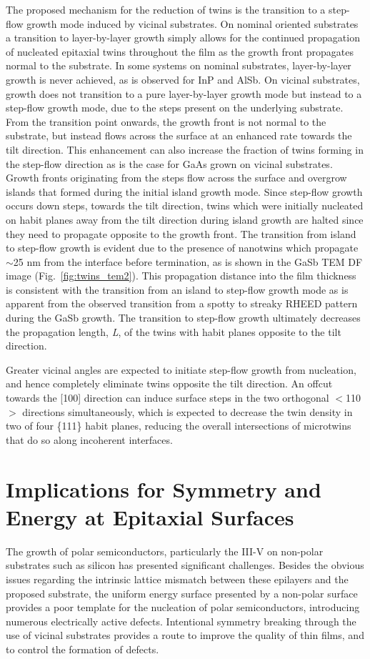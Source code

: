 The proposed mechanism for the reduction of twins is the transition to a step-flow growth mode induced by vicinal substrates. On nominal oriented substrates a transition to layer-by-layer growth simply allows for the continued propagation of nucleated epitaxial twins throughout the film as the growth front propagates normal to the substrate. In some systems on nominal substrates, layer-by-layer growth is never achieved, as is observed for InP and AlSb. On vicinal substrates, growth does not transition to a pure layer-by-layer growth mode but instead to a step-flow growth mode, due to the steps present on the underlying substrate. From the transition point onwards, the growth front is not normal to the substrate, but instead flows across the surface at an enhanced rate towards the tilt direction. This enhancement can also increase the fraction of twins forming in the step-flow direction as is the case for GaAs grown on vicinal substrates. Growth fronts originating from the steps flow across the surface and overgrow islands that formed during the initial island growth mode. Since step-flow growth occurs down steps, towards the tilt direction, twins which were initially nucleated on habit planes away from the tilt direction during island growth are halted since they need to propagate opposite to the growth front. The transition from island to step-flow growth is evident due to the presence of nanotwins which propagate $\sim$25 nm from the interface before termination, as is shown in the GaSb TEM DF image (Fig.~\ref{fig:twins_tem2}). This propagation distance into the film thickness is consistent with the transition from an island to step-flow growth mode as is apparent from the observed transition from a spotty to streaky RHEED pattern during the GaSb growth. The transition to step-flow growth ultimately decreases the propagation length, \textit{L}, of the twins with habit planes opposite to the tilt direction. 

Greater vicinal angles are expected to initiate step-flow growth from nucleation, and hence completely eliminate twins opposite the tilt direction. An offcut towards the [100] direction can induce surface steps in the two orthogonal $<$110$>$ directions simultaneously\cite{Fang1990}, which is expected to decrease the twin density in two of four \{111\} habit planes, reducing the overall intersections of microtwins that do so along incoherent interfaces.
\section{Implications for Symmetry and Energy at Epitaxial Surfaces}
The growth of polar semiconductors, particularly the III-V on non-polar substrates such as silicon has presented significant challenges. Besides the obvious issues regarding the intrinsic lattice mismatch between these epilayers and the proposed substrate, the uniform energy surface presented by a non-polar surface provides a poor template for the nucleation of polar semiconductors, introducing numerous electrically active defects. Intentional symmetry breaking through the use of vicinal substrates provides a route to improve the quality of thin films, and to control the formation of defects.

